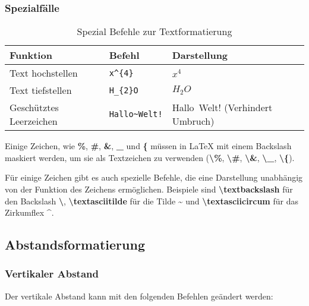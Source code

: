 \subsubsection{Spezialfälle}

\begin{table}[H]
    \centering
    \begin{tabular}{lll}
        \toprule
        \textbf{Funktion}       & \textbf{Befehl}                     & \textbf{Darstellung}             \\
        \midrule
        Text hochstellen        & \texttt{x\textasciicircum\{4\}}     & $x^{4}$                          \\
        Text tiefstellen        & \texttt{H\_\{2\}O}                  & $H_{2}O$                         \\
        Geschütztes Leerzeichen & \texttt{Hallo\textasciitilde Welt!} & Hallo~Welt! (Verhindert Umbruch) \\
        \bottomrule
    \end{tabular}
    \caption{Spezial Befehle zur Textformatierung}
    \label{tab:textformatierung}
\end{table}

Einige Zeichen, wie \textbf{\%}, \textbf{\#}, \textbf{\&}, \textbf{\_} und \textbf{\{} müssen in \LaTeX{} mit einem Backslash maskiert werden, um sie als Textzeichen zu verwenden (\textbf{\textbackslash\%}, \textbf{\textbackslash\#}, \textbf{\textbackslash\&}, \textbf{\textbackslash\_}, \textbf{\textbackslash\{}).

Für einige Zeichen gibt es auch spezielle Befehle, die eine Darstellung unabhängig von der Funktion des Zeichens ermöglichen. Beispiele sind \textbf{\textbackslash textbackslash} für den Backslash \textbf{\textbackslash}, \textbf{\textbackslash textasciitilde} für die Tilde \textbf{\textasciitilde} und \textbf{\textbackslash textasciicircum} für das Zirkumflex \textbf{\textasciicircum}.

\subsection{Abstandsformatierung}
\subsubsection{Vertikaler Abstand}
Der vertikale Abstand kann mit den folgenden Befehlen geändert werden:



